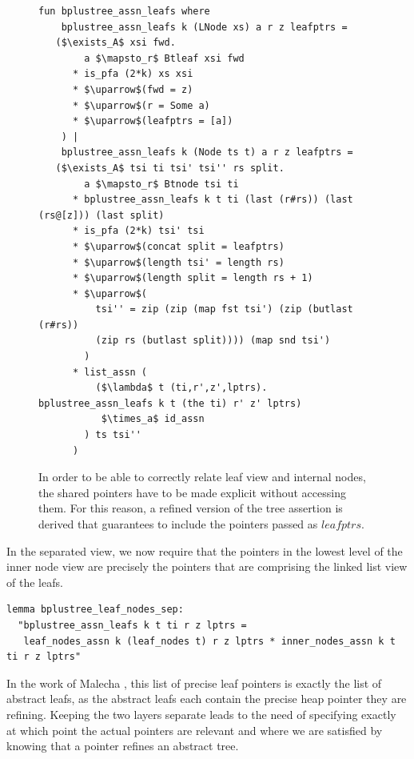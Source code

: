\documentclass[a4paper,UKenglish,cleveref, autoref, thm-restate]{lipics-v2021}
\begin{document}
\begin{figure}
    \centering
\begin{lstlisting}[mathescape=true, language=Isabelle,label=lst:btree-assn-leafs]
fun bplustree_assn_leafs where
    bplustree_assn_leafs k (LNode xs) a r z leafptrs =
   ($\exists_A$ xsi fwd.
        a $\mapsto_r$ Btleaf xsi fwd
      * is_pfa (2*k) xs xsi
      * $\uparrow$(fwd = z)
      * $\uparrow$(r = Some a)
      * $\uparrow$(leafptrs = [a])
    ) |
    bplustree_assn_leafs k (Node ts t) a r z leafptrs =
   ($\exists_A$ tsi ti tsi' tsi'' rs split.
        a $\mapsto_r$ Btnode tsi ti
      * bplustree_assn_leafs k t ti (last (r#rs)) (last (rs@[z])) (last split)
      * is_pfa (2*k) tsi' tsi
      * $\uparrow$(concat split = leafptrs)
      * $\uparrow$(length tsi' = length rs)
      * $\uparrow$(length split = length rs + 1)
      * $\uparrow$(
          tsi'' = zip (zip (map fst tsi') (zip (butlast (r#rs))
          (zip rs (butlast split)))) (map snd tsi')
        )
      * list_assn (
          ($\lambda$ t (ti,r',z',lptrs). bplustree_assn_leafs k t (the ti) r' z' lptrs)
           $\times_a$ id_assn
        ) ts tsi''
      )
\end{lstlisting}
    \caption[Definition of extracted leafs assertion]{
        In order to be able to correctly relate leaf view and internal nodes,
        the shared pointers have to be made explicit without accessing them.
        For this reason, a refined version of the tree assertion is derived
        that guarantees to include the pointers passed as $leafptrs$.
    }
    \label{fig:btree-assn-leafs}
\end{figure}


In the separated view, we now require that the pointers
in the lowest level of the inner node view are precisely the pointers
that are comprising the linked list view of the leafs.

\begin{lstlisting}[mathescape=true, language=Isabelle,label=lst:btree-view-split]
lemma bplustree_leaf_nodes_sep:
  "bplustree_assn_leafs k t ti r z lptrs =
   leaf_nodes_assn k (leaf_nodes t) r z lptrs * inner_nodes_assn k t ti r z lptrs"
\end{lstlisting}


In the work of Malecha \cite{DBLP:conf/popl/MalechaMSW10}, 
this list of precise leaf pointers is exactly the list of abstract leafs,
as the abstract leafs each contain the precise heap pointer they are refining.
Keeping the two layers separate leads to the need of specifying
exactly at which point the actual pointers are relevant
and where we are satisfied by knowing that a pointer refines
an abstract tree.
\end{document}
